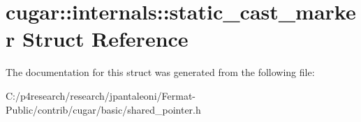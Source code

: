 \hypertarget{structcugar_1_1internals_1_1static__cast__marker}{}\section{cugar\+:\+:internals\+:\+:static\+\_\+cast\+\_\+marker Struct Reference}
\label{structcugar_1_1internals_1_1static__cast__marker}


The documentation for this struct was generated from the following file\+:\begin{DoxyCompactItemize}
\item 
C\+:/p4research/research/jpantaleoni/\+Fermat-\/\+Public/contrib/cugar/basic/shared\+\_\+pointer.\+h\end{DoxyCompactItemize}
